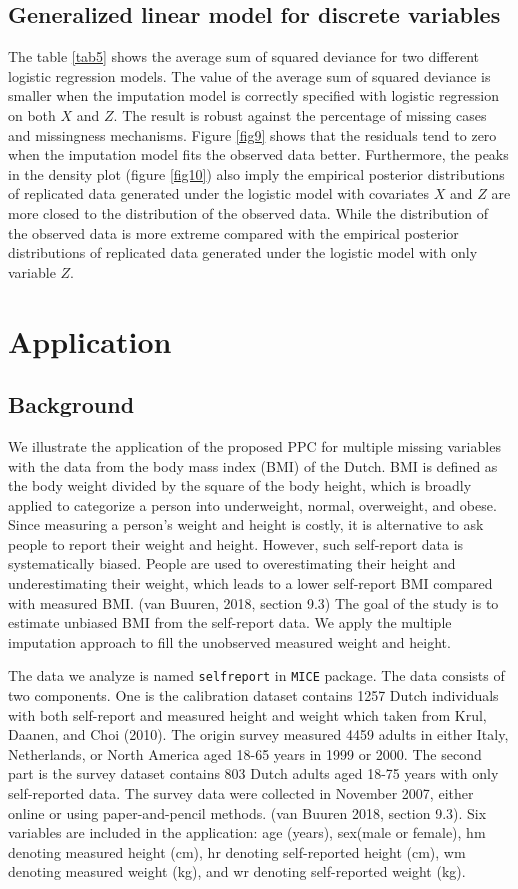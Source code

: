 \documentclass[12pt, fullpage, a4paper]{article}
\begin{document}
\subsection{Generalized linear model for discrete variables}
The table \ref{tab5} shows the average sum of squared deviance for two different logistic regression models. The value of the average sum of squared deviance is smaller when the imputation model is correctly specified with logistic regression on both $X$ and $Z$. The result is robust against the percentage of missing cases and missingness mechanisms. Figure \ref{fig9} shows that the residuals tend to zero when the imputation model fits the observed data better. Furthermore, the peaks in the density plot (figure \ref{fig10}) also imply the empirical posterior distributions of replicated data generated under the logistic model with covariates $X$ and $Z$ are more closed to the distribution of the observed data. While the distribution of the observed data is more extreme compared with the empirical posterior distributions of replicated data generated under the logistic model with only variable $Z$. 

\section{Application}
\subsection{Background}
We illustrate the application of the proposed PPC for multiple missing variables with the data from the body mass index (BMI) of the Dutch. BMI is defined as the body weight divided by the square of the body height, which is broadly applied to categorize a person into underweight, normal, overweight, and obese. Since measuring a person's weight and height is costly, it is alternative to ask people to report their weight and height. However, such self-report data is systematically biased. People are used to overestimating their height and underestimating their weight, which leads to a lower self-report BMI compared with measured BMI. (van Buuren, 2018, section 9.3) The goal of the study is to estimate unbiased BMI from the self-report data. We apply the multiple imputation approach to fill the unobserved measured weight and height. 

The data we analyze is named \texttt{selfreport} in \texttt{MICE} package. The data consists of two components. One is the calibration dataset contains 1257 Dutch individuals with both self-report and measured height and weight which taken from Krul, Daanen, and Choi (2010)\nocite{krul2011self}. The origin survey measured 4459 adults in either Italy, Netherlands, or North America aged 18-65 years in 1999 or 2000. The second part is the survey dataset contains 803 Dutch adults aged 18-75 years with only self-reported data. The survey data were collected in November 2007, either online or using paper-and-pencil methods. (van Buuren 2018, section 9.3). Six variables are included in the application: age (years), sex(male or female), hm denoting measured height (cm), hr denoting self-reported height (cm), wm denoting measured weight (kg), and wr denoting self-reported weight (kg). 
\end{document}
